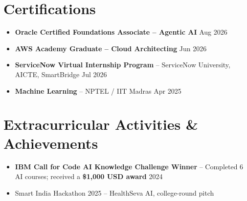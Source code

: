 \documentclass[a4paper,10pt]{article}
\begin{document}
\section{Certifications}
\small
\begin{itemize}[leftmargin=1.2em,itemsep=1pt,topsep=1pt,parsep=0pt]
  \item \small{\textbf{Oracle Certified Foundations Associate -- Agentic AI} \hfill Aug 2026}
  \item \small{\textbf{AWS Academy Graduate -- Cloud Architecting} \hfill Jun 2026}
  \item \small{\textbf{ServiceNow Virtual Internship Program} -- ServiceNow University, AICTE, SmartBridge \hfill Jul 2026}
  \item \small{\textbf{Machine Learning} -- NPTEL / IIT Madras \hfill Apr 2025}
\end{itemize}

\section{Extracurricular Activities \& Achievements}
\small
\begin{itemize}[leftmargin=1.2em,itemsep=1pt,topsep=1.8pt,parsep=0pt]
  \item \small{\textbf{IBM Call for Code AI Knowledge Challenge Winner} -- Completed 6 AI courses; received a \textbf{\$1,000 USD award} \hfill 2024}
  \item \small{Smart India Hackathon 2025 -- HealthSeva AI, college-round pitch}
\end{itemize}
\end{document}
